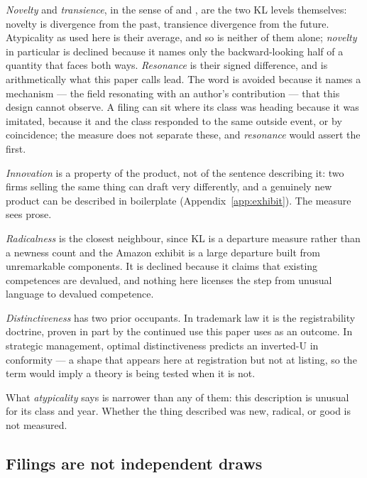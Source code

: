 \emph{Novelty} and \emph{transience}, in the sense of
\citet{Murdock2017} and \citet{Barron2018}, are the two KL levels
themselves: novelty is divergence from the past, transience divergence
from the future. Atypicality as used here is their average, and so is
neither of them alone; \emph{novelty} in particular is declined because it
names only the backward-looking half of a quantity that faces both ways.
\emph{Resonance} is their signed difference, and is arithmetically what
this paper calls lead. The word is avoided because it names a
mechanism --- the field resonating with an author's contribution --- that
this design cannot observe. A filing can sit where its class was heading
because it was imitated, because it and the class responded to the same
outside event, or by coincidence; the measure does not separate these,
and \emph{resonance} would assert the first.

\emph{Innovation} is a property of the product, not of the sentence
describing it: two firms selling the same thing can draft very differently,
and a genuinely new product can be described in boilerplate
(Appendix~\ref{app:exhibit}). The measure sees prose.

\emph{Radicalness} \citep{DewarDutton1986, TushmanAnderson1986,
HendersonClark1990} is the closest neighbour, since KL is a departure
measure rather than a newness count and the Amazon exhibit is a large
departure built from unremarkable components. It is declined because it
claims that existing competences are devalued, and nothing here licenses the
step from unusual language to devalued competence.

\emph{Distinctiveness} has two prior occupants. In trademark law it is the
registrability doctrine, proven in part by the continued use this paper uses
as an outcome. In strategic management, optimal distinctiveness
\citep{Zhao2017} predicts an inverted-U in conformity --- a shape that
appears here at registration but not at listing, so the term would imply a
theory is being tested when it is not.

What \emph{atypicality} says is narrower than any of them: this description
is unusual for its class and year. Whether the thing described was new,
radical, or good is not measured.

\subsection{Filings are not independent draws}

